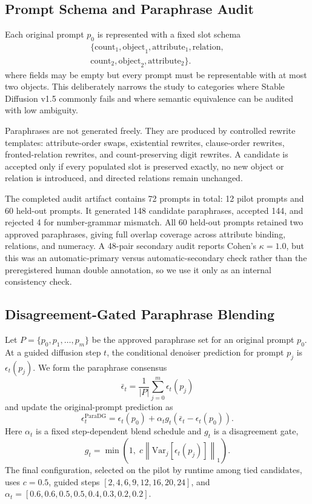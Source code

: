 \documentclass{article}
\newcommand{\method}{ParaDG}
\begin{document}
\subsection{Prompt Schema and Paraphrase Audit}
Each original prompt $p_0$ is represented with a fixed slot schema
\begin{equation}
\begin{split}
\{\text{count}_1,\text{object}_1,\text{attribute}_1,\text{relation},\\
\text{count}_2,\text{object}_2,\text{attribute}_2\}.
\end{split}
\end{equation}
where fields may be empty but every prompt must be representable with at most two objects. This deliberately narrows the study to categories where Stable Diffusion v1.5 commonly fails and where semantic equivalence can be audited with low ambiguity.

Paraphrases are not generated freely. They are produced by controlled rewrite templates: attribute-order swaps, existential rewrites, clause-order rewrites, fronted-relation rewrites, and count-preserving digit rewrites. A candidate is accepted only if every populated slot is preserved exactly, no new object or relation is introduced, and directed relations remain unchanged.

The completed audit artifact contains 72 prompts in total: 12 pilot prompts and 60 held-out prompts. It generated 148 candidate paraphrases, accepted 144, and rejected 4 for number-grammar mismatch. All 60 held-out prompts retained two approved paraphrases, giving full overlap coverage across attribute binding, relations, and numeracy. A 48-pair secondary audit reports Cohen's $\kappa = 1.0$, but this was an automatic-primary versus automatic-secondary check rather than the preregistered human double annotation, so we use it only as an internal consistency check.

\subsection{Disagreement-Gated Paraphrase Blending}
Let $P=\{p_0,p_1,\dots,p_m\}$ be the approved paraphrase set for an original prompt $p_0$. At a guided diffusion step $t$, the conditional denoiser prediction for prompt $p_j$ is $\epsilon_t(p_j)$. We form the paraphrase consensus
\[
\bar{\epsilon}_t=\frac{1}{|P|}\sum_{j=0}^{m}\epsilon_t(p_j)
\]
and update the original-prompt prediction as
\[
\epsilon_t^{\text{\method}}=\epsilon_t(p_0)+\alpha_t g_t\left(\bar{\epsilon}_t-\epsilon_t(p_0)\right).
\]
Here $\alpha_t$ is a fixed step-dependent blend schedule and $g_t$ is a disagreement gate,
\[
g_t=\min\left(1,\;c\left\lVert \mathrm{Var}_j[\epsilon_t(p_j)]\right\rVert_1\right).
\]
The final configuration, selected on the pilot by runtime among tied candidates, uses $c=0.5$, guided steps $[2,4,6,9,12,16,20,24]$, and $\alpha_t=[0.6,0.6,0.5,0.5,0.4,0.3,0.2,0.2]$.
\end{document}

